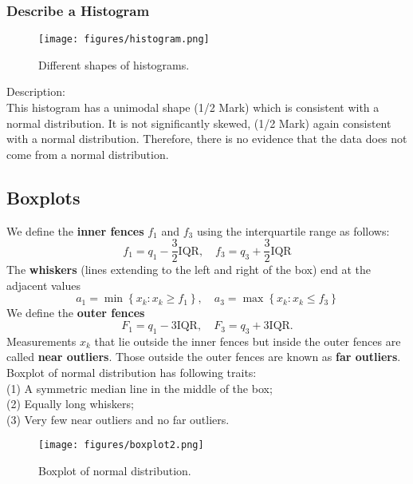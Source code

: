 \documentclass[a4paper,12pt]{article}
\begin{document}
\subsubsection{Describe a Histogram}
\begin{figure}[h] 
    \centering
    \texttt{[image: figures/histogram.png]} 
    \caption{Different shapes of histograms.} 
\end{figure}
\noindent Description:\\
This histogram has a unimodal shape (1/2 Mark) which is consistent with a normal distribution. It is not significantly skewed, (1/2 Mark) again consistent with a normal distribution. Therefore, there is no evidence that the data does not come from a normal distribution.



\subsection{Boxplots}
We define the \textbf{inner fences} $f_1$ and $f_3$ using the interquartile range as follows:
\begin{equation}
f_1=q_1-\frac{3}{2} \mathrm{IQR}, \quad f_3=q_3+\frac{3}{2} \mathrm{IQR}
\end{equation}
The \textbf{whiskers} (lines extending to the left and right of the box) end at the adjacent values
\begin{equation}
a_1=\min \left\{x_k: x_k \geq f_1\right\}, \quad a_3=\max \left\{x_k: x_k \leq f_3\right\}
\end{equation}
We define the \textbf{outer fences}
\begin{equation}
F_1=q_1-3 \mathrm{IQR}, \quad F_3=q_3+3 \mathrm{IQR} .
\end{equation}
Measurements $x_k$ that lie outside the inner fences but inside the outer fences are called \textbf{near outliers}. Those outside the outer fences are known as \textbf{far outliers}.\\

\noindent Boxplot of normal distribution has following traits:\\
(1) A symmetric median line in the middle of the box;\\
(2) Equally long whiskers;\\
(3) Very few near outliers and no far outliers.\\
\begin{figure}[h] 
    \centering
    \texttt{[image: figures/boxplot2.png]} 
    \caption{Boxplot of normal distribution.} 
\end{figure}
\end{document}
